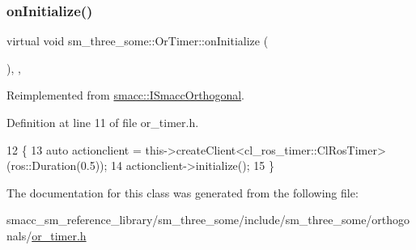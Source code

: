 \subsubsection{\texorpdfstring{on\+Initialize()}{onInitialize()}}
{\footnotesize\ttfamily virtual void sm\+\_\+three\+\_\+some\+::\+Or\+Timer\+::on\+Initialize (\begin{DoxyParamCaption}{ }\end{DoxyParamCaption})\hspace{0.3cm}{\ttfamily [inline]}, {\ttfamily [override]}, {\ttfamily [virtual]}}



Reimplemented from \hyperlink{classsmacc_1_1ISmaccOrthogonal_a6bb31c620cb64dd7b8417f8705c79c7a}{smacc\+::\+I\+Smacc\+Orthogonal}.



Definition at line 11 of file or\+\_\+timer.\+h.


\begin{DoxyCode}
12     \{
13         \textcolor{keyword}{auto} actionclient = this->createClient<cl\_ros\_timer::ClRosTimer>(ros::Duration(0.5));
14         actionclient->initialize();
15     \}
\end{DoxyCode}


The documentation for this class was generated from the following file\+:\begin{DoxyCompactItemize}
\item 
smacc\+\_\+sm\+\_\+reference\+\_\+library/sm\+\_\+three\+\_\+some/include/sm\+\_\+three\+\_\+some/orthogonals/\hyperlink{sm__three__some_2include_2sm__three__some_2orthogonals_2or__timer_8h}{or\+\_\+timer.\+h}\end{DoxyCompactItemize}

